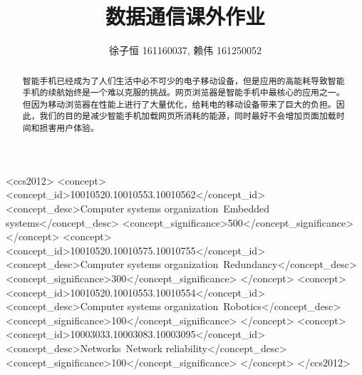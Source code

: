 \documentclass[sigconf]{acmart}
\begin{document}
\begin{CJK}{UTF8}{song}

\title{数据通信课外作业}

\author{徐子恒 161160037, 赖伟 161250052}



\begin{abstract}
智能手机已经成为了人们生活中必不可少的电子移动设备，但是应用的高能耗导致智能手机的续航始终是一个难以克服的挑战。网页浏览器是智能手机中最核心的应用之一。但因为移动浏览器在性能上进行了大量优化，给耗电的移动设备带来了巨大的负担。因此，我们的目的是减少智能手机加载网页所消耗的能源，同时最好不会增加页面加载时间和损害用户体验。
\end{abstract}

%
%
\begin{CCSXML}
<ccs2012>
 <concept>
  <concept_id>10010520.10010553.10010562</concept_id>
  <concept_desc>Computer systems organization~Embedded systems</concept_desc>
  <concept_significance>500</concept_significance>
 </concept>
 <concept>
  <concept_id>10010520.10010575.10010755</concept_id>
  <concept_desc>Computer systems organization~Redundancy</concept_desc>
  <concept_significance>300</concept_significance>
 </concept>
 <concept>
  <concept_id>10010520.10010553.10010554</concept_id>
  <concept_desc>Computer systems organization~Robotics</concept_desc>
  <concept_significance>100</concept_significance>
 </concept>
 <concept>
  <concept_id>10003033.10003083.10003095</concept_id>
  <concept_desc>Networks~Network reliability</concept_desc>
  <concept_significance>100</concept_significance>
 </concept>
</ccs2012>  
\end{CCSXML}






\end{CJK}
\end{document}
